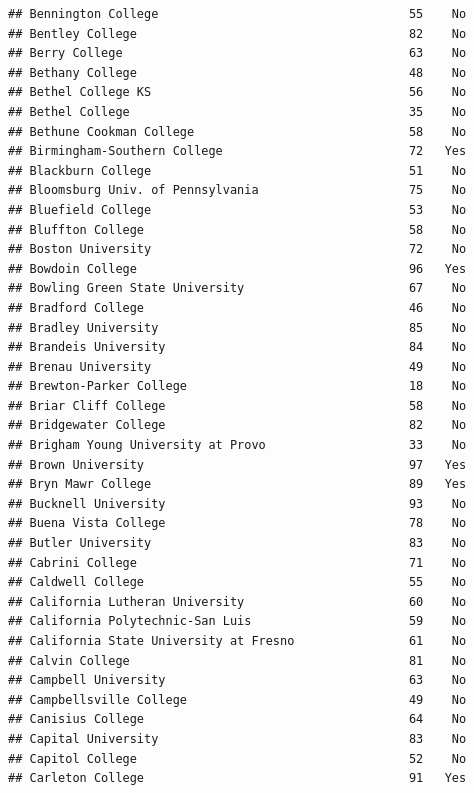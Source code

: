 \documentclass[
]{article}
\begin{document}
\begin{verbatim}
## Bennington College                                   55    No
## Bentley College                                      82    No
## Berry College                                        63    No
## Bethany College                                      48    No
## Bethel College KS                                    56    No
## Bethel College                                       35    No
## Bethune Cookman College                              58    No
## Birmingham-Southern College                          72   Yes
## Blackburn College                                    51    No
## Bloomsburg Univ. of Pennsylvania                     75    No
## Bluefield College                                    53    No
## Bluffton College                                     58    No
## Boston University                                    72    No
## Bowdoin College                                      96   Yes
## Bowling Green State University                       67    No
## Bradford College                                     46    No
## Bradley University                                   85    No
## Brandeis University                                  84    No
## Brenau University                                    49    No
## Brewton-Parker College                               18    No
## Briar Cliff College                                  58    No
## Bridgewater College                                  82    No
## Brigham Young University at Provo                    33    No
## Brown University                                     97   Yes
## Bryn Mawr College                                    89   Yes
## Bucknell University                                  93    No
## Buena Vista College                                  78    No
## Butler University                                    83    No
## Cabrini College                                      71    No
## Caldwell College                                     55    No
## California Lutheran University                       60    No
## California Polytechnic-San Luis                      59    No
## California State University at Fresno                61    No
## Calvin College                                       81    No
## Campbell University                                  63    No
## Campbellsville College                               49    No
## Canisius College                                     64    No
## Capital University                                   83    No
## Capitol College                                      52    No
## Carleton College                                     91   Yes

\end{verbatim}
\end{document}
